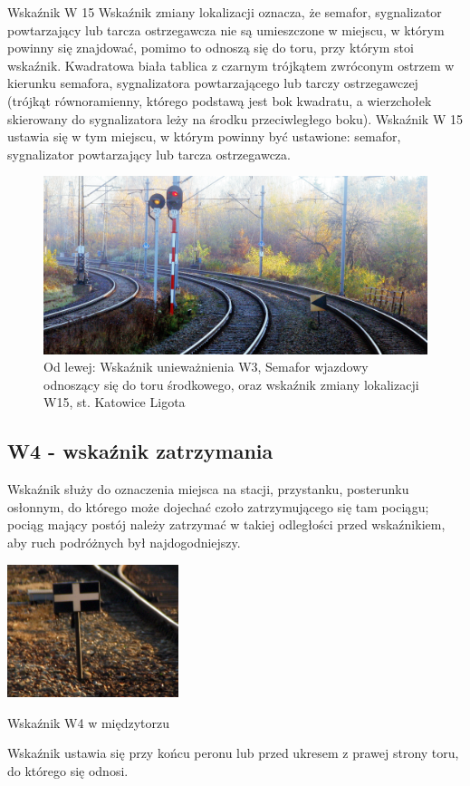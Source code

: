 Wskaźnik W 15 {\textquotedbl}Wskaźnik zmiany lokalizacji{\textquotedbl} oznacza, że semafor, sygnalizator powtarzający
lub tarcza ostrzegawcza nie są umieszczone w miejscu, w którym powinny się znajdować, pomimo to odnoszą się do toru,
przy którym stoi wskaźnik. Kwadratowa biała tablica z czarnym trójkątem zwróconym ostrzem w kierunku semafora,
sygnalizatora powtarzającego lub tarczy ostrzegawczej (trójkąt równoramienny, którego podstawą jest bok kwadratu, a
wierzchołek skierowany do sygnalizatora leży na środku przeciwległego boku). Wskaźnik W 15 ustawia się w tym miejscu, w
którym powinny być ustawione: semafor, sygnalizator powtarzający lub tarcza ostrzegawcza.

	\begin{figure}
		\includegraphics[width=13cm]{skryptkierownik-img/skryptkierownik-img005.jpg}
		\caption{Od lewej: Wskaźnik unieważnienia W3, Semafor wjazdowy odnoszący się do toru środkowego, oraz wskaźnik zmiany lokalizacji W15, st. Katowice Ligota}
	\end{figure}

\subsection{W4 - wskaźnik zatrzymania}

\begin{tcolorbox}[colback=black!5!white,colframe=white!55!black,title=Wskaźnik W4]Wskaźnik służy do oznaczenia miejsca na stacji, przystanku, posterunku osłonnym, do którego może dojechać czoło zatrzymującego się tam pociągu; pociąg mający postój należy zatrzymać w takiej odległości przed wskaźnikiem, aby ruch podróżnych był najdogodniejszy.
\end{tcolorbox}
	
\begin{marginfigure}
	\includegraphics[width=5cm]{skryptkierownik-img/skryptkierownik-img006.jpg}
	\caption{Wskaźnik W4 w międzytorzu}
\end{marginfigure} 
Wskaźnik ustawia się przy końcu peronu lub przed ukresem z prawej strony toru, do którego się odnosi.

